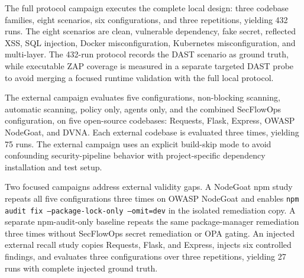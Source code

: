 The full protocol campaign executes the complete local design: three codebase families, eight scenarios, six configurations, and three repetitions, yielding 432 runs. The eight scenarios are clean, vulnerable dependency, fake secret, reflected XSS, SQL injection, Docker misconfiguration, Kubernetes misconfiguration, and multi-layer. The 432-run protocol records the DAST scenario as ground truth, while executable ZAP coverage is measured in a separate targeted DAST probe to avoid merging a focused runtime validation with the full local protocol.

The external campaign evaluates five configurations, non-blocking scanning, automatic scanning, policy only, agents only, and the combined SecFlowOps configuration, on five open-source codebases: Requests, Flask, Express, OWASP NodeGoat, and DVNA. Each external codebase is evaluated three times, yielding 75 runs. The external campaign uses an explicit build-skip mode to avoid confounding security-pipeline behavior with project-specific dependency installation and test setup.

Two focused campaigns address external validity gaps. A NodeGoat npm study repeats all five configurations three times on OWASP NodeGoat and enables \texttt{npm audit fix --package-lock-only --omit=dev} in the isolated remediation copy. A separate npm-audit-only baseline repeats the same package-manager remediation three times without SecFlowOps secret remediation or OPA gating. An injected external recall study copies Requests, Flask, and Express, injects six controlled findings, and evaluates three configurations over three repetitions, yielding 27 runs with complete injected ground truth.

